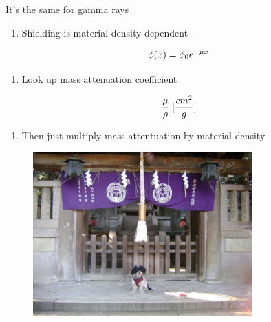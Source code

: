 \documentclass[aspectratio=1610,pdftex,dvipsnames,compress,xcolor={dvipsnames}]{beamer}
\begin{document}
\begin{frame}{It's the same for gamma rays}
    \begin{enumerate}[series=outerlist,topsep=0pt,itemsep=11pt,leftmargin=*,label=(\arabic*)]
        \item[]Shielding is material density dependent
    \end{enumerate}

    \vspace*{\fill}

    \begin{equation}
        \LARGE
        \phi(x) = \phi_0 e^{-\mu x}
    \end{equation}

    \vspace*{\fill}

    \begin{enumerate}[series=outerlist,topsep=0pt,itemsep=11pt,leftmargin=*,label=(\arabic*)]
        \item[]Look up mass attenuation coefficient
    \end{enumerate}

    \vspace*{\fill}

    \begin{equation}
        \LARGE
        \frac{\mu}{\rho} \; [\frac{cm^2}{g}]
    \end{equation}

    \vspace*{\fill}

    \begin{enumerate}[series=outerlist,topsep=0pt,itemsep=11pt,leftmargin=*,label=(\arabic*)]
        \item[]Then just multiply mass attentuation by material density
    \end{enumerate}
\end{frame}


\begin{frame}[plain]{}
    \begin{figure}
        \centering
        \includegraphics[width=0.75\textwidth]{final.jpg}
    \end{figure}
\end{frame}
\end{document}
